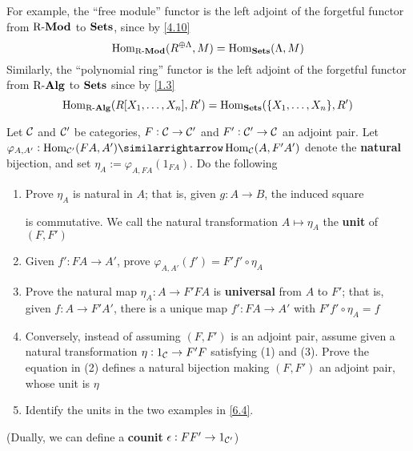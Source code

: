 \documentclass[11pt]{article}
\begin{document}
For example, the ``free module'' functor is the left adjoint of the forgetful
functor from \(\operatorname{R-\textbf{Mod}}\) to \(\operatorname{\textbf{Sets}}\), since by \ref{4.10}
\begin{equation*}
\operatorname{Hom}_{\operatorname{R-\textbf{Mod}}}(R^{\oplus\Lambda},M)=\operatorname{Hom}_{\operatorname{\textbf{Sets}}}(\Lambda,M)
\end{equation*}
Similarly, the ``polynomial ring'' functor is the left adjoint of the forgetful
functor from \(\operatorname{R-\textbf{Alg}}\) to \(\operatorname{\textbf{Sets}}\) since by \ref{1.3}
\begin{equation*}
\operatorname{Hom}_{\operatorname{R-\textbf{Alg}}}(R[X_1,\dots,X_n],R')=\operatorname{Hom}_{\operatorname{\textbf{Sets}}}(\{X_1,\dots,X_n\},R')
\end{equation*}


\begin{exercise}
\label{6.5}
Let \(\mathcal{C}\) and \(\mathcal{C}'\) be categories, \(F:\mathcal{C}\to\mathcal{C}'\) and
\(F':\mathcal{C}'\to\mathcal{C}\) an adjoint pair. Let
\(\varphi_{A,A'}:\Hom_{\calc'}(FA,A')\similarrightarrow\Hom_{\calc}(A,F'A')\)
denote the \textbf{natural} bijection, and set \(\eta_A:=\varphi_{A,FA}(1_{FA})\). Do
the following
\begin{enumerate}
\item Prove \(\eta_A\) is natural in \(A\); that is, given \(g:A\to B\), the
induced square
\begin{center}
\end{center}
is commutative. We call the natural transformation \(A\mapsto\eta_A\) the
\textbf{unit} of \((F,F')\)
\item Given \(f':FA\to A'\), prove \(\varphi_{A,A'}(f')=F'f'\circ\eta_A\)
\item Prove the natural map \(\eta_A:A\to F'FA\) is \textbf{universal} from \(A\) to
\(F'\); that is, given \(f:A\to F'A'\), there is a unique map \(f':FA\to
      A'\) with \(F'f'\circ\eta_A=f\)
\item Conversely, instead of assuming \((F,F')\) is an adjoint pair, assume
given a natural transformation \(\eta:1_{\mathcal{C}}\to F'F\) satisfying (1) and
(3). Prove the equation in (2) defines a natural bijection making
\((F,F')\) an adjoint pair, whose unit is \(\eta\)
\item Identify the units in the two examples in \ref{6.4}.
\end{enumerate}


(Dually, we can define a \textbf{counit} \(\epsilon:FF'\to 1_{\mathcal{C}'}\))
\end{exercise}
\end{document}
